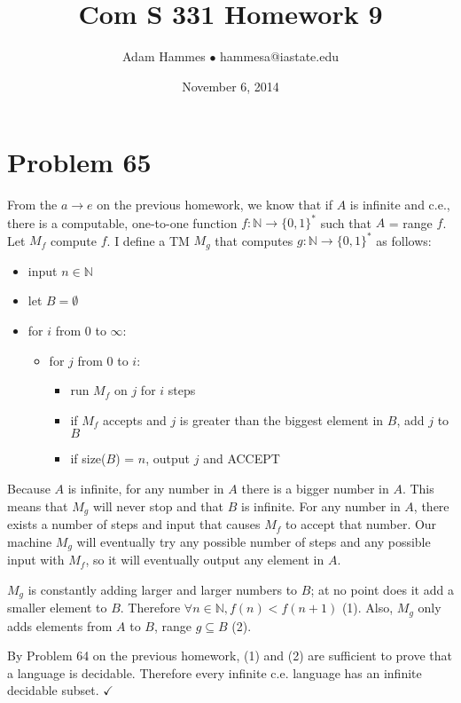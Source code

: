 \documentclass[11pt]{article}
\let\imp\rightarrow
\begin{document}
\title{Com S 331 Homework 9}
\author{Adam Hammes $\bullet$ hammesa@iastate.edu}
\date{November 6, 2014}
\maketitle

\section*{Problem 65}

From the $a \imp e$ on the previous homework, we know that if $A$ is infinite and c.e., there is a computable, one-to-one function $f: \mathbb{N} \imp \{0,1\}^*$ such that $A$ = range $f$. Let $M_f$ compute $f$. I define a TM $M_g$ that computes $g: \mathbb{N} \imp \{0,1\}^*$ as follows:
\begin{itemize}
	\item input $n \in \mathbb{N}$
	\item let $B = \emptyset$
	\item for $i$ from 0 to $\infty$:
	\begin{itemize}
		\item for $j$ from 0 to $i$:
		\begin{itemize}
			\item run $M_f$ on $j$ for $i$ steps
			\item if $M_f$ accepts and $j$ is greater than the biggest element in $B$, add $j$ to $B$
			\item if size($B$) = $n$, output $j$ and ACCEPT
		\end{itemize}
	\end{itemize}
\end{itemize}
Because $A$ is infinite, for any number in $A$ there is a bigger number in $A$.
This means that $M_g$ will never stop and that $B$ is infinite.
For any number in $A$, there exists a number of steps and input that causes $M_f$ to accept that number.
Our machine $M_g$ will eventually try any possible number of steps and any possible input with $M_f$, so it will eventually output any element in $A$.

$M_g$ is constantly adding larger and larger numbers to $B$; at no point does it add a smaller element to $B$.
Therefore $\forall n \in \mathbb{N}, f(n) < f(n+1)$ (1).
Also, $M_g$ only adds elements from $A$ to $B$, range $g \subseteq B$ (2).

By Problem 64 on the previous homework, (1) and (2) are sufficient to prove that a language is decidable.
Therefore every infinite c.e. language has an infinite decidable subset. $\checkmark$
\end{document}

